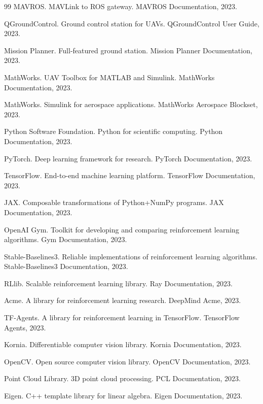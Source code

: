 \documentclass[12pt,a4paper]{ctexart}
\begin{document}
\begin{thebibliography}{99}
 MAVROS. MAVLink to ROS gateway. MAVROS Documentation, 2023.

 QGroundControl. Ground control station for UAVs. QGroundControl User Guide, 2023.

 Mission Planner. Full-featured ground station. Mission Planner Documentation, 2023.

 MathWorks. UAV Toolbox for MATLAB and Simulink. MathWorks Documentation, 2023.

 MathWorks. Simulink for aerospace applications. MathWorks Aerospace Blockset, 2023.

 Python Software Foundation. Python for scientific computing. Python Documentation, 2023.

 PyTorch. Deep learning framework for research. PyTorch Documentation, 2023.

 TensorFlow. End-to-end machine learning platform. TensorFlow Documentation, 2023.

 JAX. Composable transformations of Python+NumPy programs. JAX Documentation, 2023.

 OpenAI Gym. Toolkit for developing and comparing reinforcement learning algorithms. Gym Documentation, 2023.

 Stable-Baselines3. Reliable implementations of reinforcement learning algorithms. Stable-Baselines3 Documentation, 2023.

 RLlib. Scalable reinforcement learning library. Ray Documentation, 2023.

 Acme. A library for reinforcement learning research. DeepMind Acme, 2023.

 TF-Agents. A library for reinforcement learning in TensorFlow. TensorFlow Agents, 2023.

 Kornia. Differentiable computer vision library. Kornia Documentation, 2023.

 OpenCV. Open source computer vision library. OpenCV Documentation, 2023.

 Point Cloud Library. 3D point cloud processing. PCL Documentation, 2023.

 Eigen. C++ template library for linear algebra. Eigen Documentation, 2023.


\end{thebibliography}
\end{document}
